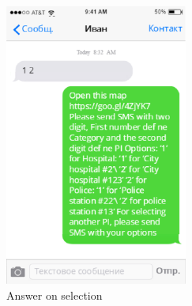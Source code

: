 \begin{figure}
  \centering
    \includegraphics[width=6cm]{images/mockups/feature3-PI/3.eps}
  \caption{Answer on selection}
  \label{fig:Answeronselection}
\end{figure}


